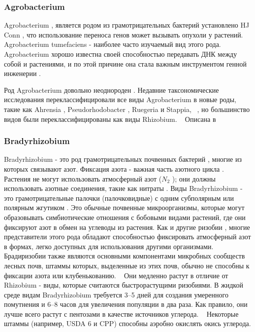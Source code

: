\documentclass[11pt]{article}
\begin{document}
	\subsubsection{Agrobacterium}
	Agrobacterium , является родом из грамотрицательных бактерий установлено HJ Conn , что использование переноса генов может вызывать опухоли у растений. Agrobacterium tumefaciens - наиболее часто изучаемый вид этого рода. Agrobacterium хорошо известна своей способностью передавать ДНК между собой и растениями, и по этой причине она стала важным инструментом генной инженерии .
	
	Род Agrobacterium довольно неоднороден . Недавние таксономические исследования переклассифицировали все виды Agrobacterium в новые роды, такие как Ahrensia , Pseudorhodobacter , Ruegeria и Stappia, ~\cite{Agrobacterium_1, Agrobacterium_2}, но большинство видов были переклассифицированы как виды Rhizobium. ~\cite{Agrobacterium_3, Agrobacterium_4, Agrobacterium_5}
	Описана в ~\cite{Agrobacterium_1,Agrobacterium_2,Agrobacterium_3,Agrobacterium_4,Agrobacterium_5,Agrobacterium_6,Agrobacterium_7,Agrobacterium_8,Agrobacterium_9,Agrobacterium_10,Agrobacterium_11,Agrobacterium_12,Agrobacterium_13,Agrobacterium_14,Agrobacterium_15,Agrobacterium_16,Agrobacterium_17,Agrobacterium_18,Agrobacterium_19,Agrobacterium_20,Agrobacterium_21,Agrobacterium_22}
	
	\subsubsection{Bradyrhizobium}
	Bradyrhizobium - это род грамотрицательных почвенных бактерий , многие из которых связывают азот. Фиксация азота - важная часть азотного цикла . Растения не могут использовать атмосферный азот ($N_2$ ); они должны использовать азотные соединения, такие как нитраты .
	Виды Bradyrhizobium - это грамотрицательные палочки (палочковидные) с одним субполярным или полярным жгутиком . Это обычные почвенные микроорганизмы, которые могут образовывать симбиотические отношения с бобовыми видами растений, где они фиксируют азот в обмен на углеводы из растения. Как и другие ризобии , многие представители этого рода обладают способностью фиксировать атмосферный азот в формах, легко доступных для использования другими организмами. Брадиризобии также являются основными компонентами микробных сообществ лесных почв, штаммы которых, выделенные из этих почв, обычно не способны к фиксации азота или клубенькованию. ~\cite{Bradyrhizobium_3} Они медленно растут в отличие от Rhizobium - виды, которые считаются быстрорастущими ризобиями. В жидкой среде видам Bradyrhizobium требуется 3–5 дней для создания умеренного помутнения и 6–8 часов для увеличения популяции в два раза. Как правило, они лучше всего растут с пентозами в качестве источников углерода. ~\cite{Bradyrhizobium_4} Некоторые штаммы (например, USDA 6 и CPP) способны аэробно окислять окись углерода. ~\cite{Bradyrhizobium_5}
	
\end{document}
